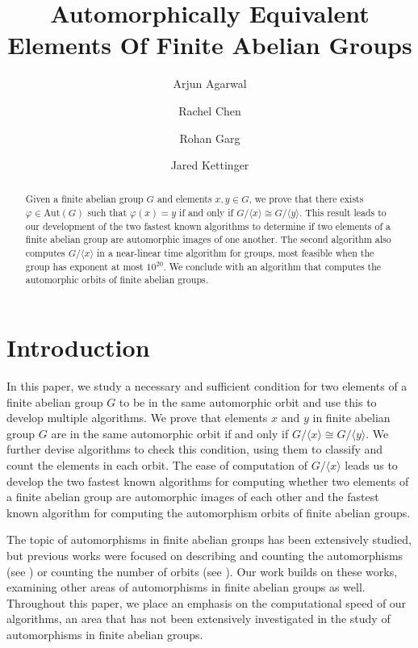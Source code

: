 \documentclass[11pt]{amsart}
\theoremstyle{definition}
\renewcommand{\phi}{\varphi}
\newcommand{\Aut}{\text{Aut}}
\newcommand{\setx}{\langle x \rangle}
\newcommand{\sety}{\langle y \rangle}
\numberwithin{equation}{section}
\begin{document}
\address{PRIMES-USA}
\author{Arjun Agarwal}
\author{Rachel Chen}
\author{Rohan Garg}
\author{Jared Kettinger}

\title{Automorphically Equivalent Elements  Of Finite Abelian Groups}


\begin{abstract}
Given a finite abelian group $G$ and elements $x, y \in G$, we prove that there exists $\phi \in \Aut(G)$ such that $\phi(x) = y$ if and only if $G/\setx \cong G/\sety$. This result leads to our development of the two fastest known algorithms to determine if two elements of a finite abelian group are automorphic images of one another. The second algorithm also computes $G/\langle x \rangle$ in a near-linear time algorithm for groups, most feasible when the group has exponent at most $10^{20}$. We conclude with an algorithm that computes the automorphic orbits of finite abelian groups.
\end{abstract}
\maketitle

\sloppy
\section{Introduction}

In this paper, we study a necessary and sufficient condition for two elements of a finite abelian group $G$ to be in the same automorphic orbit and use this to develop multiple algorithms. We prove that elements $x$ and $y$ in finite abelian group $G$ are in the same automorphic orbit if and only if $G/\setx \cong G/\sety$. We further devise algorithms to check this condition, using them to classify and count the elements in each orbit. The ease of computation of $G/\setx$ leads us to develop the two fastest known algorithms for computing whether two elements of a finite abelian group are automorphic images of each other and the fastest known algorithm for computing the automorphism orbits of finite abelian groups. 

The topic of automorphisms in finite abelian groups has been extensively studied, but previous works were focused on describing and counting the automorphisms (see \cite{hillar}) or counting the number of orbits (see \cite{SS, dutta}). Our work builds on these works, examining other areas of automorphisms in finite abelian groups as well. Throughout this paper, we place an emphasis on the computational speed of our algorithms, an area that has not been extensively investigated in the study of automorphisms in finite abelian groups. 
\end{document}
